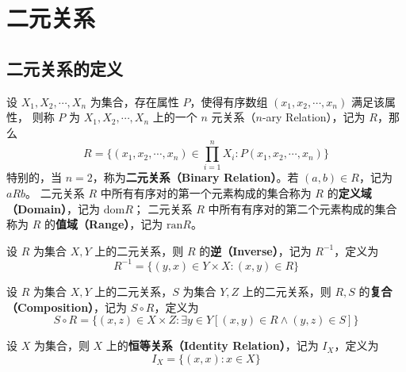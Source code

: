 \section{二元关系}
\subsection{二元关系的定义}
\begin{definition}[关系 Relation]
    设 $ X_1, X_2, \cdots, X_{n} $ 为集合，存在属性 $ P $，使得有序数组 $ (x_1, x_2, \cdots, x_n) $ 满足该属性，
    则称 $ P $ 为 $ X_1, X_2, \cdots, X_n $ 上的一个 $ n $ 元关系（$ n $-ary Relation），记为 $R$，那么
    \[
        R = \{(x_1, x_2, \cdots, x_n)\in \prod^n_{i=1}X_i : P(x_1, x_2, \cdots, x_n)\}
    \]  
    特别的，当 $ n=2 $，称为\textbf{二元关系（Binary Relation）}。若 $ (a,b)\in R $，记为 $ aRb $。
    二元关系 $ R $ 中所有有序对的第一个元素构成的集合称为 $ R $ 的\textbf{定义域（Domain）}，记为 $ \mathrm{dom}R $；
    二元关系 $ R $ 中所有有序对的第二个元素构成的集合称为 $ R $ 的\textbf{值域（Range）}，记为 $ \mathrm{ran}R $。
\end{definition}
\vspace{1em}

\begin{definition}
    设 $ R $ 为集合 $ X, Y $ 上的二元关系，则 $ R $ 的\textbf{逆（Inverse）}，记为 $ R^{-1} $，定义为
    \[
        R^{-1} = \{(y,x)\in Y\times X : (x,y)\in R\}
    \]
\end{definition}
\vspace{1em}

\begin{definition}
    设 $ R $ 为集合 $ X, Y $ 上的二元关系，$ S $ 为集合 $ Y, Z $ 上的二元关系，则 $ R, S $ 的\textbf{复合（Composition）}，记为 $ S\circ R $，定义为
    \[
        S\circ R = \{(x,z)\in X\times Z : \exists y\in Y[(x,y)\in R \land (y,z)\in S]\}
    \]
\end{definition}
\vspace{1em}

\begin{definition}
    设 $ X $ 为集合，则 $ X $ 上的\textbf{恒等关系（Identity Relation）}，记为 $ I_X $，定义为
    \[
        I_X = \{(x,x) : x\in X\}
    \]
\end{definition}
\vspace{1em}

